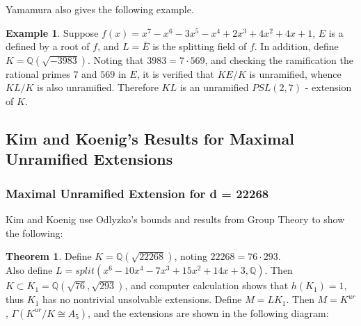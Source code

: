 \documentclass[12pt]{extarticle}
\newcommand{\Q}{\mathbb{Q}}
\newcommand{\<}{\langle}
\renewcommand{\>}{\rangle}
\theoremstyle{definition}
\newtheorem{theorem}{Theorem}
\newtheorem{example}{Example}
\begin{document}
Yamamura also gives the following example. 
\begin{example}
Suppose $f(x) = x^7 - x^6 - 3x^5 - x^4 + 2x^3 + 4x^2 + 4x + 1$, $E$ is a defined by a root of $f$, and $L = \bar{E}$ is the splitting field of $f$. In addition, define $K=\Q(\sqrt{-3983})$. Noting that $3983 = 7 \cdot 569$, and checking the ramification the rational primes $7$ and $569$ in $E$, it is verified that $KE/K$ is unramified, whence $KL/K$ is also unramified. Therefore $KL$ is an unramified $PSL(2,7)$ - extension of $K$. 
\end{example}

\subsection{Kim and Koenig's Results for Maximal Unramified Extensions}
\subsubsection*{Maximal Unramified Extension for d = 22268}
Kim and Koenig \cite{KIM2017} use Odlyzko's bounds and results from Group Theory to show the following: 
\begin{theorem}
 Define $K=\Q(\sqrt{22268})$, noting $22268 = 76\cdot 293$. \\ Also define $L=split(x^6-10x^4-7x^3+15x^2+14x+3,\Q)$. Then $K \subset K_1=\Q(\sqrt{76},\sqrt{293})$, and computer calculation shows that $h(K_1) = 1$, thus $K_1$ has no nontrivial unsolvable extensions. Define $M=LK_1$. Then $M=K^{ur}$, $\Gamma(K^{ur}/K \cong A_5)$, and the extensions are shown in the following diagram:   
\end{theorem}
\begin{center}
\end{center}
\end{document}
